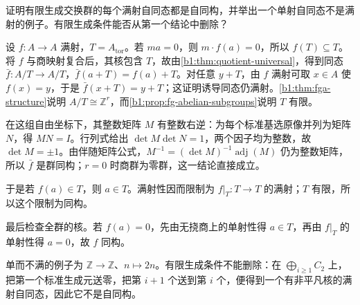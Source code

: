 \begin{exercise}\label{b1:ex:09-fg-endomorphism}
	证明有限生成交换群的每个满射自同态都是自同构，并举出一个单射自同态不是满射的例子。有限生成条件能否从第一个结论中删除？
\end{exercise}
\begin{solution}
	设 \(f:A\to A\) 满射，\(T=A_{\mathrm{tor}}\)。若 \(ma=0\)，则 \(m\cdot f(a)=0\)，所以 \(f(T)\subseteq T\)。将 \(f\) 与商映射复合后，其核包含 \(T\)，故由\cref{b1:thm:quotient-universal}，得到同态 \(\bar f:A/T\to A/T\)，\(\bar f(a+T)=f(a)+T\)。对任意 \(y+T\)，由 \(f\) 满射可取 \(x\in A\) 使 \(f(x)=y\)，于是 \(\bar f(x+T)=y+T\)；这证明诱导同态仍满射。\cref{b1:thm:fga-structure}说明 \(A/T\cong\mathbb Z^r\)，而\cref{b1:prop:fg-abelian-subgroups}说明 \(T\) 有限。

	在这组自由坐标下，其整数矩阵 \(M\) 有整数右逆：为每个标准基选原像并列为矩阵 \(N\)，得 \(MN=I\)。行列式给出 \(\det M\det N=1\)，两个因子均为整数，故 \(\det M=\pm1\)。由伴随矩阵公式，\(M^{-1}=(\det M)^{-1}\operatorname{adj}(M)\) 仍为整数矩阵，所以 \(\bar f\) 是群同构；\(r=0\) 时商群为零群，这一结论直接成立。

	于是若 \(f(a)\in T\)，则 \(a\in T\)。满射性因而限制为 \(f|_T:T\to T\) 的满射；\(T\) 有限，所以这个限制为同构。

	最后检查全群的核。若 \(f(a)=0\)，先由无挠商上的单射性得 \(a\in T\)，再由 \(f|_T\) 的单射性得 \(a=0\)，故 \(f\) 同构。

	单而不满的例子为 \(\mathbb Z\to\mathbb Z\)、\(n\mapsto2n\)。有限生成条件不能删除：在 \(\bigoplus_{i\ge1}C_2\) 上，把第一个标准生成元送零，把第 \(i+1\) 个送到第 \(i\) 个，便得到一个有非平凡核的满射自同态，因此它不是自同构。
\end{solution}

